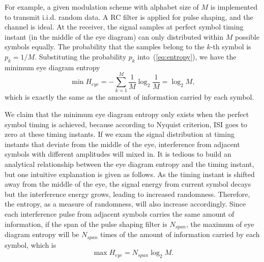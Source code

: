 \documentclass[journal,comsoc, onecolumn, 12pt,draftclsnofoot]{IEEEtran} %
\begin{document}
For example, a given modulation scheme with alphabet size of \(M\) is implemented to transmit i.i.d. random data. 
A RC filter is applied for pulse shaping, and the channel is ideal.
At the receiver, the signal samples at perfect symbol timing instant (in the middle of the eye diagram) can only distributed within \(M\) possible symbols equally.
The probability that the samples belong to the $k$-th symbol is \(p_k=1/M\).
Substituting the probability \(p_k\) into~(\ref{eq:entropy}), we have the minimum eye diagram entropy
\begin{equation}
\min{H_{eye}} =  - \sum\limits_{k = 1}^M {{\frac{1}{M}}\log_2 {\frac{1}{M}}}=\log_2 {M},
\label{eq:entropy_mid}
\end{equation}
which is exactly the same as the amount of information carried by each symbol.


We claim that the minimum eye diagram entropy only exists when the perfect symbol timing is achieved, because according to Nyquist criterion, ISI goes to zero at these timing instants.
If we exam the signal distribution at timing instants that deviate from the middle of the eye, interference from adjacent symbols with different amplitudes will mixed in.
It is tedious to build an analytical relationship between the eye diagram entropy and the timing instant, but one intuitive explanation is given as follows.
As the timing instant is shifted away from the middle of the eye, the signal energy from current symbol decays but the interference  energy grows, leading to increased randomness.
% 
% 
Therefore, the entropy, as a measure of randomness,  will also increase accordingly.
Since each interference pulse from adjacent symbols carries the same amount of information, 
if the span of the pulse shaping filter is \(N_{span}\), 
the maximum of eye diagram entropy will be \(N_{span}\) times of the amount of information carried by each symbol, which is 
% 
% 
\begin{equation}
\max{H_{eye}} =  N_{span}\log_2 {M}.
\label{eq:entropy_neb}
\end{equation}
\end{document}
